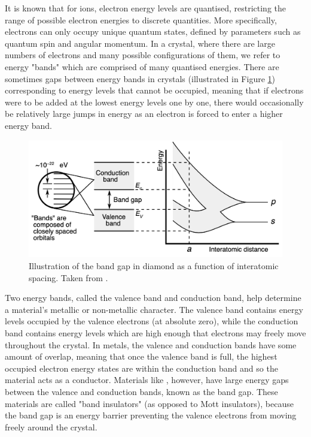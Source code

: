 It is known that for ions, electron energy levels are quantised, restricting the range of possible electron energies to discrete quantities. More specifically, electrons can only occupy unique quantum states, defined by parameters such as quantum spin and angular momentum. In a crystal, where there are large numbers of electrons and many possible configurations of them, we refer to energy "bands" which are comprised of many quantised energies. There are sometimes gaps between energy bands in crystals (illustrated in Figure \ref{figure:band_gap}) corresponding to energy levels that cannot be occupied, meaning that if electrons were to be added at the lowest energy levels one by one, there would occasionally be relatively large jumps in energy as an electron is forced to enter a higher energy band. 

\begin{figure}[htp]
\centering
\includegraphics[width=\linewidth]{images/band_gap.png}
\caption[Illustration of the band gap in diamond as a function of interatomic spacing.]{Illustration of the band gap in diamond as a function of interatomic spacing. Taken from \cite{Chetvorno2017}.}
\label{figure:band_gap}
\end{figure}

Two energy bands, called the valence band and conduction band, help determine a material's metallic or non-metallic character. The valence band contains energy levels occupied by the valence electrons (at absolute zero), while the conduction band contains energy levels which are high enough that electrons may freely move throughout the crystal. In metals, the valence and conduction bands have some amount of overlap, meaning that once the valence band is full, the highest occupied electron energy states are within the conduction band and so the material acts as a conductor. Materials like \zirconia , however, have large energy gaps between the valence and conduction bands, known as the band gap. These materials are called "band insulators" (as opposed to Mott insulators), because the band gap is an energy barrier preventing the valence electrons from moving freely around the crystal.

